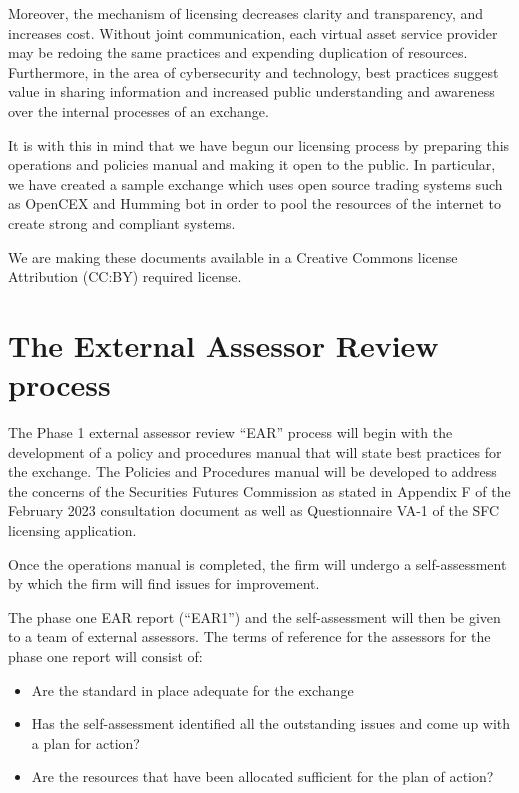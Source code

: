 Moreover, the mechanism of licensing decreases clarity and
transparency, and increases cost.  Without joint communication, each
virtual asset service provider may be redoing the same practices and
expending duplication of resources.  Furthermore, in the area of
cybersecurity and technology, best practices suggest value in sharing
information and increased public understanding and awareness over the
internal processes of an exchange.

It is with this in mind that we have begun our licensing process by
preparing this operations and policies manual and making it open to
the public.  In particular, we have created a sample exchange which
uses open source trading systems such as OpenCEX and Humming bot in
order to pool the resources of the internet to create strong and
compliant systems.

We are making these documents available in a Creative Commons license
Attribution (CC:BY) required license.

\section{The External Assessor Review process}

The Phase 1 external assessor review ``EAR'' process will begin with
the development of a policy and procedures manual that will state best
practices for the exchange.  The Policies and Procedures manual will
be developed to address the concerns of the Securities Futures
Commission as stated in Appendix F of the February 2023 consultation
document as well as Questionnaire VA-1 of the SFC licensing
application.

Once the operations manual is completed, the firm will undergo a
self-assessment by which the firm will find issues for improvement.

The phase one EAR report (``EAR1'') and the self-assessment will then
be given to a team of external assessors.  The terms of reference for
the assessors for the phase one report will consist of:

\begin{itemize}
\item Are the standard in place adequate for the exchange
  \item Has the self-assessment identified all the outstanding
    issues and come up with a plan for action?
  \item Are the resources that have been allocated sufficient for the
    plan of action?
\end{itemize}

